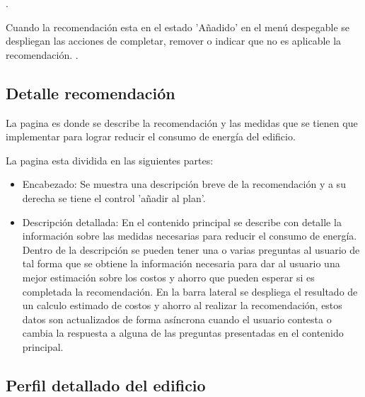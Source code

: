 .

Cuando la recomendación esta en el estado 'Añadido' en el menú despegable
se despliegan las acciones de completar, remover o indicar que no es aplicable
la recomendación.
.

\subsection{Detalle recomendación}

La pagina  es donde se describe la
recomendación y las medidas que se tienen que implementar para lograr
reducir el consumo de energía del edificio.

La pagina esta dividida en las siguientes partes:
\begin{itemize}
\item Encabezado: Se muestra una descripción breve de la recomendación y a su
  derecha se tiene el control 'añadir al plan'.
\item Descripción detallada: En el contenido principal se describe con detalle
  la información sobre las medidas necesarias para reducir el consumo de energía.
  Dentro de la descripción se pueden tener una o varias preguntas al usuario
  de tal forma que se obtiene la información necesaria para dar al usuario
  una mejor estimación sobre los costos y ahorro que pueden esperar si es
  completada la recomendación.
  En la barra lateral se despliega el resultado de un calculo estimado
  de costos y ahorro al realizar la recomendación, estos datos son
  actualizados de forma asíncrona cuando el usuario contesta o cambia
  la respuesta a alguna de las preguntas presentadas en el contenido
  principal.
\end{itemize}

\subsection{Perfil detallado del edificio}

